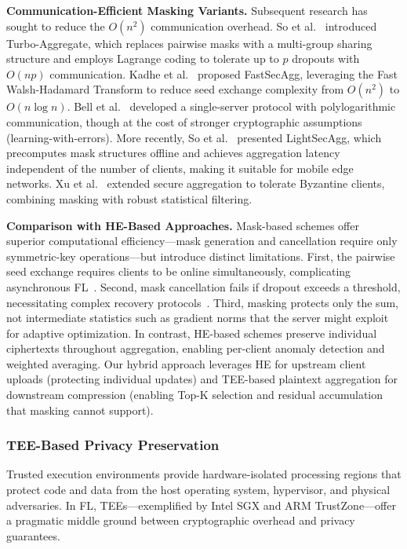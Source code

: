 \textbf{Communication-Efficient Masking Variants.} Subsequent research has sought to reduce the $O(n^2)$ communication overhead. So et al.~\cite{so2021turbo} introduced Turbo-Aggregate, which replaces pairwise masks with a multi-group sharing structure and employs Lagrange coding to tolerate up to $p$ dropouts with $O(np)$ communication. Kadhe et al.~\cite{kadhe2021fastsecagg} proposed FastSecAgg, leveraging the Fast Walsh-Hadamard Transform to reduce seed exchange complexity from $O(n^2)$ to $O(n \log n)$. Bell et al.~\cite{bell2020secure} developed a single-server protocol with polylogarithmic communication, though at the cost of stronger cryptographic assumptions (learning-with-errors). More recently, So et al.~\cite{so2022lightsecagg} presented LightSecAgg, which precomputes mask structures offline and achieves aggregation latency independent of the number of clients, making it suitable for mobile edge networks. Xu et al.~\cite{xu2022byzantine} extended secure aggregation to tolerate Byzantine clients, combining masking with robust statistical filtering.

\textbf{Comparison with HE-Based Approaches.} Mask-based schemes offer superior computational efficiency---mask generation and cancellation require only symmetric-key operations---but introduce distinct limitations. First, the pairwise seed exchange requires clients to be online simultaneously, complicating asynchronous FL~\cite{bonawitz2017practical}. Second, mask cancellation fails if dropout exceeds a threshold, necessitating complex recovery protocols~\cite{so2021turbo}. Third, masking protects only the sum, not intermediate statistics such as gradient norms that the server might exploit for adaptive optimization. In contrast, HE-based schemes preserve individual ciphertexts throughout aggregation, enabling per-client anomaly detection and weighted averaging. Our hybrid approach leverages HE for upstream client uploads (protecting individual updates) and TEE-based plaintext aggregation for downstream compression (enabling Top-K selection and residual accumulation that masking cannot support).

\subsubsection{TEE-Based Privacy Preservation}
\label{subsubsec:tee-based}

Trusted execution environments provide hardware-isolated processing regions that protect code and data from the host operating system, hypervisor, and physical adversaries. In FL, TEEs---exemplified by Intel SGX and ARM TrustZone---offer a pragmatic middle ground between cryptographic overhead and privacy guarantees.

